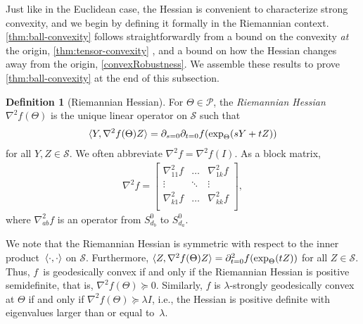 \documentclass[aos]{imsart}
\theoremstyle{definition}
\newtheorem{definition}{Definition}
\renewcommand{\vec}{\bm}
\newcommand{\Sym}{\mathcal{S}}
\newcommand{\smallSym}{S}
\newcommand{\SPD}{\mathcal{P}}
\newcommand{\CF}[1]{{\color{purple}[CF: #1]}}
\newcommand{\MW}[1]{{\color{red}[MW: #1]}}
\begin{document}
Just like in the Euclidean case, the Hessian is convenient to characterize strong convexity, and we begin by defining it formally in the Riemannian context. \cref{thm:ball-convexity} follows straightforwardly from a bound on the convexity \emph{at} the origin,  \cref{thm:tensor-convexity} , and a bound on how the Hessian changes away from the origin, \cref{convexRobustness}. We assemble these results to prove \cref{thm:ball-convexity} at the end of this subsection. %




\begin{definition}[Riemannian Hessian]
For $\Theta \in \SPD$, the \emph{Riemannian Hessian}~$\nabla^2 f(\Theta)$ is the unique linear operator on $\Sym$ such that
\begin{align*}
  \braket{Y, \nabla^2 f(\Theta) Z} = \partial_{s=0} \partial_{t=0} f(\exp_{\Theta}(sY + tZ))
\end{align*}
for all $Y, Z\in \Sym$.
We often abbreviate $\nabla^2 f = \nabla^2 f(I)$.
As a block matrix,
\begin{align*}
  \nabla^2 f = \begin{bmatrix}
  \nabla_{11}^2 f & \dots & \nabla_{1k}^2 f \\
  \vdots & \ddots & \vdots \\
  \nabla_{k1}^2 f & \dots & \nabla_{kk}^2 f \\
  \end{bmatrix},
\end{align*}
where $\nabla_{ab}^2f$ is an operator from $\smallSym_{d_b}^0$ to $\smallSym_{d_a}^0$.
\end{definition}

We note that the Riemannian Hessian is symmetric with respect to the inner product~$\braket{\cdot,\cdot}$ on $\Sym$.
Furthermore, $\braket{Z, \nabla^2 f(\Theta) Z} = \partial^2_{t=0} f(\exp_{\Theta}(tZ))$ for all $Z\in \Sym$.
Thus, $f$~is geodesically convex if and only if the Riemannian Hessian is positive semidefinite, that is, $\nabla^2 f(\Theta) \succeq 0$.
Similarly, $f$ is $\lambda$-strongly geodesically convex at $\Theta$ if and only if $\nabla^2 f(\Theta) \succeq \lambda I$, i.e., the Hessian is positive definite with eigenvalues larger than or equal to~$\lambda$.
\end{document}
